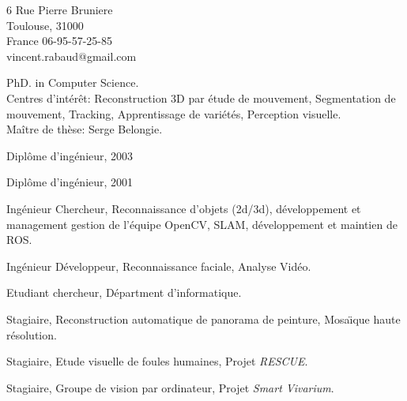 

\addresses
{6 Rue Pierre Bruniere\\
Toulouse, 31000\\
France}
{
06-95-57-25-85\\
vincent.rabaud@gmail.com}

\begin{llist}

 
PhD. in Computer Science.\\
Centres d'int\'{e}r\^{e}t: Reconstruction 3D par \'{e}tude de mouvement, Segmentation de mouvement, Tracking, Apprentissage de vari\'{e}t\'{e}s, Perception visuelle.\\
Ma\^{i}tre de th\`{e}se: Serge Belongie.

 
Dipl\^{o}me d'ing\'{e}nieur, 2003

 
Dipl\^{o}me d'ing\'{e}nieur, 2001

Ing\'{e}nieur Chercheur, Reconnaissance d'objets (2d/3d), d\'{e}veloppement et management gestion de l'\'{e}quipe 
OpenCV, SLAM, d\'{e}veloppement et maintien de ROS.

Ing\'{e}nieur D\'{e}veloppeur, Reconnaissance faciale, Analyse
Vid\'{e}o.

Etudiant chercheur, D\'{e}partment d'informatique.

Stagiaire, Reconstruction automatique de panorama de peinture, Mosa\"{\i}que haute r\'{e}solution.

Stagiaire, Etude visuelle de foules humaines, Projet {\em RESCUE}.

Stagiaire, Groupe de vision par ordinateur, Projet {\em Smart Vivarium}.


\end{llist}
